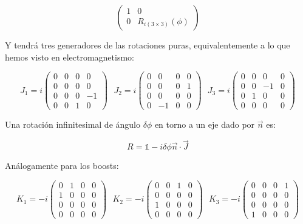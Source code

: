 \documentclass{article}
\begin{document}
$$\left (\begin{array}{cccc}
1 & 0 \\
0 & R_{i(3\times 3)}(\phi)
\end{array}\right )$$

Y tendrá tres generadores de las rotaciones puras, equivalentemente a lo que hemos visto en electromagnetismo:


$$J_1= i\left (\begin{array}{cccc}
0 & 0 &  0 &  0\\
0 & 0 &  0 & 0 \\
0 & 0 & 0 & -1\\
0 & 0 & 1 & 0
\end{array} \right )\ \ \ J_2= i\left (\begin{array}{cccc}
0 & 0 &  0 &  0\\
0 & 0 &  0 & 1 \\
0 & 0 & 0 & 0\\
0 & -1 & 0 & 0
\end{array} \right )\ \ \ J_3= i\left (\begin{array}{cccc}
0 & 0 &  0 &  0\\
0 & 0 &  -1 & 0 \\
0 & 1 & 0 & 0\\
0 & 0 & 0 & 0
\end{array} \right )$$


Una rotación infinitesimal de ángulo $\delta \phi$ en torno a un eje dado por $\Vec{n}$ es:

$$R=\mathds{1}-i\delta \phi \Vec{n}\cdot \Vec{J}$$

Análogamente para los boosts:

$$K_1= -i\left (\begin{array}{cccc}
0 & 1 &  0 &  0\\
1 & 0 &  0 & 0 \\
0 & 0 & 0 & 0\\
0 & 0 & 0 & 0
\end{array} \right ) \ \ \ K_2= -i\left (\begin{array}{cccc}
0 & 0 &  1 &  0\\
0 & 0 &  0 & 0 \\
1 & 0 & 0 & 0\\
0 & 0 & 0 & 0
\end{array} \right ) \ \ \ K_3= -i\left (\begin{array}{cccc}
0 & 0 &  0 &  1\\
0 & 0 &  0 & 0 \\
0 & 0 & 0 & 0\\
1 & 0 & 0 & 0
\end{array} \right )$$
\end{document}
